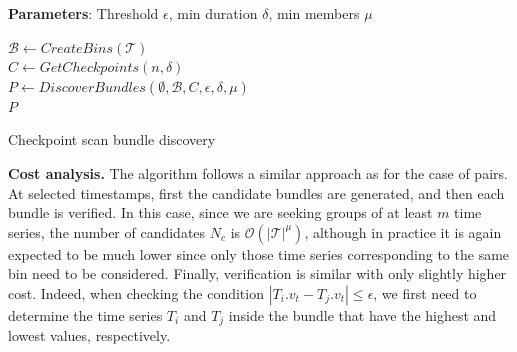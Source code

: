 \begin{algorithm}[ht!]
    \DontPrintSemicolon
    \begin{footnotesize}
    \nonl \textbf{Parameters}: Threshold $\epsilon$, min duration $\delta$, min members $\mu$ \\
    \vspace{4pt}
    
    $\mathcal{B} \leftarrow CreateBins(\mathcal{T})$ \\
    $C \leftarrow GetCheckpoints(n, \delta)$ \\
    $P \leftarrow DiscoverBundles(\emptyset, \mathcal{B}, C, \epsilon, \delta, \mu)$ \\
    \KwRet $P$ \\
    
    \vspace{4pt}
    \end{footnotesize}
    \caption{Checkpoint scan bundle discovery}
    \label{alg:checkpoint_scan_bundle}
\end{algorithm}

\textbf{Cost analysis.} The algorithm follows a similar approach as for the case of pairs. At selected timestamps, first the candidate bundles are generated, and then each bundle is verified. In this case, since we are seeking groups of at least $m$ time series, the number of candidates $N_c$ is $\mathcal{O}(|\mathcal{T}|^{\mu})$, although in practice it is again expected to be much lower since only those time series corresponding to the same bin need to be considered. Finally, verification is similar with only slightly higher cost. Indeed, when checking the condition $|T_i.v_{t} - T_j.v_{t}| \leq \epsilon$, we first need to determine the time series $T_i$ and $T_j$ inside the bundle that have the highest and lowest values, respectively.